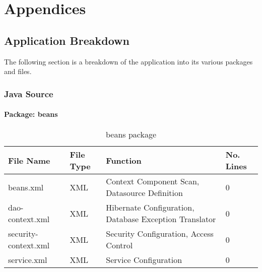 \chapter{Appendices}
\label{appendices}

\section{Application Breakdown}
\label{sec:appbreakdnown}
The following section is a breakdown of the application into its various packages and files.
\subsection{Java Source}
\subsubsection{Package: beans}
\begin{table}[H]
\begin{center}
    \begin{tabular}{| l | l | l| p{1cm} |}
    \hline
    File Name & File Type & Function & No. Lines\\ \hline
    beans.xml & XML & Context Component Scan, Datasource Definition & 0 \\ \hline
	dao-context.xml & XML & Hibernate Configuration, Database Exception Translator & 0 \\ \hline
	security-context.xml & XML & Security Configuration, Access Control & 0 \\ \hline
	service.xml & XML & Service Configuration & 0 \\ \hline
    \end{tabular}
\end{center}
\caption{beans package}
\end{table}

